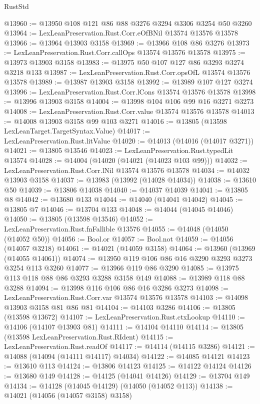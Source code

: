 \begin{lexlean}{RustStd}
\begin{coremodule}
{\begin{coremodule}
{{{{{{{{{{{{{{{{{{{{{{{{{{{{{{{{{{{{{{{@13960 := @13950 @108 @121 @86 @88 @3276 @3294 @3306 @3254 @50 @3260
@13964 := LexLeanPreservation.Rust.Corr.eOfBNil @13574 @13576 @13578
@13966 := @13964 @13903 @3158
@13969 := @13966 @108 @86 @3276
@13973 := LexLeanPreservation.Rust.Corr.callOps @13574 @13576 @13578
@13975 := @13973 @13903 @3158
@13983 := @13975 @50 @107 @127 @86 @3293 @3274 @3218 @133
@13987 := LexLeanPreservation.Rust.Corr.opsOfL @13574 @13576 @13578
@13989 := @13987 @13903 @3158
@13992 := @13989 @107 @127 @3274
@13996 := LexLeanPreservation.Rust.Corr.lCons @13574 @13576 @13578
@13998 := @13996 @13903 @3158
@14004 := @13998 @104 @106 @99 @16 @3271 @3273
@14008 := LexLeanPreservation.Rust.Corr.value @13574 @13576 @13578
@14013 := @14008 @13903 @3158 @99 @103 @3271
@14016 := @13805 (@13598 LexLeanTarget.TargetSyntax.Value)
@14017 := LexLeanPreservation.Rust.litValue
@14020 := @14013 (@14016 (@14017 @3271))
@14021 := @13805 @13546
@14023 := LexLeanPreservation.Rust.typedLit @13574
@14028 := @14004 (@14020 (@14021 (@14023 @103 @99)))
@14032 := LexLeanPreservation.Rust.Corr.lNil @13574 @13576 @13578
@14034 := @14032 @13903 @3158
@14037 := @13983 (@13992 (@14028 @14034))
@14038 := @13610 @50
@14039 := @13806 @14038
@14040 := @14037 @14039
@14041 := @13805 @8
@14042 := @13680 @133
@14044 := @14040 (@14041 @14042)
@14045 := @13805 @7
@14046 := @13704 @133
@14048 := @14044 (@14045 @14046)
@14050 := @13805 (@13598 @13546)
@14052 := LexLeanPreservation.Rust.fnFallible @13576
@14055 := @14048 (@14050 (@14052 @50))
@14056 := Bool.or
@14057 := Bool.not
@14059 := @14056 (@14057 @3218)
@14061 := @14021 (@14059 @3158)
@14064 := @13960 (@13969 (@14055 @14061))
@14074 := @13950 @119 @106 @86 @16 @3290 @3293 @3273 @3254 @113 @3260
@14077 := @13966 @119 @86 @3290
@14085 := @13975 @113 @118 @88 @86 @3293 @3288 @3158 @149
@14088 := @13989 @118 @88 @3288
@14094 := @13998 @116 @106 @86 @16 @3286 @3273
@14098 := LexLeanPreservation.Rust.Corr.var @13574 @13576 @13578
@14103 := @14098 @13903 @3158 @81 @86 @81
@14104 := @14103 @3286
@14106 := @13805 (@13598 @13672)
@14107 := LexLeanPreservation.Rust.ctxLookup
@14110 := @14106 (@14107 @13903 @81)
@14111 := @14104 @14110
@14114 := @13805 (@13598 LexLeanPreservation.Rust.RIdent)
@14115 := LexLeanPreservation.Rust.readOf
@14117 := @14114 (@14115 @3286)
@14121 := @14088 (@14094 (@14111 @14117) @14034)
@14122 := @14085 @14121
@14123 := @13610 @113
@14124 := @13806 @14123
@14125 := @14122 @14124
@14126 := @13680 @149
@14128 := @14125 (@14041 @14126)
@14129 := @13704 @149
@14134 := @14128 (@14045 @14129) (@14050 (@14052 @113))
@14138 := @14021 (@14056 (@14057 @3158) @3158)
}}}}}}}}}}}}}}}}}}}}}}}}}}}}}}}}}}}}}}}
\end{coremodule}}
\end{coremodule}
\end{lexlean}
